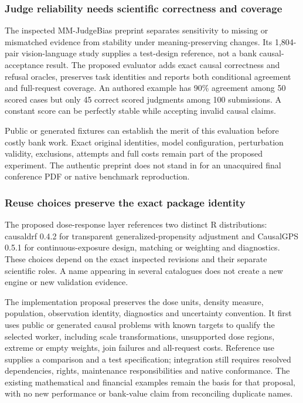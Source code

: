 \hypertarget{judge-reliability-needs-scientific-correctness-and-coverage}{%
\subsubsection{Judge reliability needs scientific correctness and
coverage}\label{judge-reliability-needs-scientific-correctness-and-coverage}}

The inspected MM-JudgeBias preprint separates sensitivity to missing or
mismatched evidence from stability under meaning-preserving changes. Its
1,804-pair vision-language study supplies a test-design reference, not a
bank causal-acceptance result. The proposed evaluator adds exact causal
correctness and refusal oracles, preserves task identities and reports
both conditional agreement and full-request coverage. An authored
example has 90\% agreement among 50 scored cases but only 45 correct
scored judgments among 100 submissions. A constant score can be
perfectly stable while accepting invalid causal claims.
\citep{exec24_judgebias_original,exec24_judgebias_reference}

Public or generated fixtures can establish the merit of this evaluation
before costly bank work. Exact original identities, model configuration,
perturbation validity, exclusions, attempts and full costs remain part
of the proposed experiment. The authentic preprint does not stand in for
an unacquired final conference PDF or native benchmark reproduction.

\hypertarget{reuse-choices-preserve-the-exact-package-identity}{%
\subsubsection{Reuse choices preserve the exact package
identity}\label{reuse-choices-preserve-the-exact-package-identity}}

The proposed dose-response layer references two distinct R
distributions: causaldrf 0.4.2 for transparent generalized-propensity
adjustment and CausalGPS 0.5.1 for continuous-exposure design, matching
or weighting and diagnostics. These choices depend on the exact
inspected revisions and their separate scientific roles. A name
appearing in several catalogues does not create a new engine or new
validation evidence.
\citep{exec24_dose_causaldrf,exec24_dose_causalgps,sp24dosealiases_decisions}

The implementation proposal preserves the dose units, density measure,
population, observation identity, diagnostics and uncertainty
convention. It first uses public or generated causal problems with known
targets to qualify the selected worker, including scale transformations,
unsupported dose regions, extreme or empty weights, join failures and
all-request costs. Reference use supplies a comparison and a test
specification; integration still requires resolved dependencies, rights,
maintenance responsibilities and native conformance. The existing
mathematical and financial examples remain the basis for that proposal,
with no new performance or bank-value claim from reconciling duplicate
names.
\citep{exec24_dose_original,exec24_dose_contract,sp24dosealiases_decisions}

